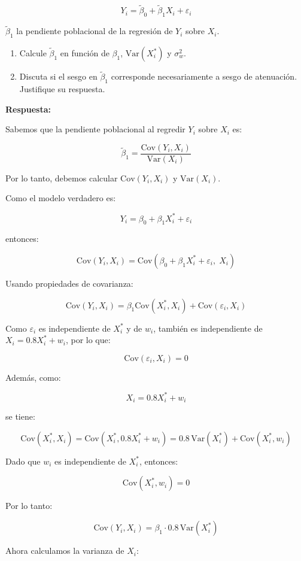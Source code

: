 \documentclass[10pt,a4paper]{article}
\begin{document}
\begin{enumerate}
\[
Y_i = \tilde\beta_0 + \tilde\beta_1 X_i + \varepsilon_i
\]


\(\tilde{\beta}_1\) la pendiente poblacional de la regresión de \(Y_i\) sobre \(X_i\). 

\begin{enumerate}
    \item Calcule \(\tilde{\beta}_1\) en función de \(\beta_1\), \(\mathrm{Var}(X_i^*)\) y \(\sigma_w^2\).
    \item Discuta si el sesgo en $\tilde\beta_1$ corresponde necesariamente a sesgo de atenuación. Justifique su respuesta.
\end{enumerate}

\textbf{Respuesta:}

Sabemos que la pendiente poblacional al regredir \(Y_i\) sobre \(X_i\) es:

\[
\tilde{\beta}_1 = \frac{\mathrm{Cov}(Y_i,X_i)}{\mathrm{Var}(X_i)}
\]

Por lo tanto, debemos calcular \(\mathrm{Cov}(Y_i,X_i)\) y \(\mathrm{Var}(X_i)\).

Como el modelo verdadero es:

\[
Y_i = \beta_0 + \beta_1 X_i^* + \varepsilon_i
\]

entonces:

\[
\mathrm{Cov}(Y_i,X_i)
=
\mathrm{Cov}(\beta_0 + \beta_1 X_i^* + \varepsilon_i,\; X_i)
\]

Usando propiedades de covarianza:

\[
\mathrm{Cov}(Y_i,X_i)
=
\beta_1 \mathrm{Cov}(X_i^*,X_i) + \mathrm{Cov}(\varepsilon_i,X_i)
\]

Como \(\varepsilon_i\) es independiente de \(X_i^*\) y de \(w_i\), también es independiente de \(X_i=0.8X_i^*+w_i\), por lo que:

\[
\mathrm{Cov}(\varepsilon_i,X_i)=0
\]

Además, como:

\[
X_i = 0.8X_i^* + w_i
\]

se tiene:

\[
\mathrm{Cov}(X_i^*,X_i)
=
\mathrm{Cov}(X_i^*,0.8X_i^* + w_i)
=
0.8\,\mathrm{Var}(X_i^*) + \mathrm{Cov}(X_i^*,w_i)
\]

Dado que \(w_i\) es independiente de \(X_i^*\), entonces:

\[
\mathrm{Cov}(X_i^*,w_i)=0
\]

Por lo tanto:

\[
\mathrm{Cov}(Y_i,X_i)=\beta_1 \cdot 0.8\,\mathrm{Var}(X_i^*)
\]

Ahora calculamos la varianza de \(X_i\):


\end{enumerate}
\end{document}
